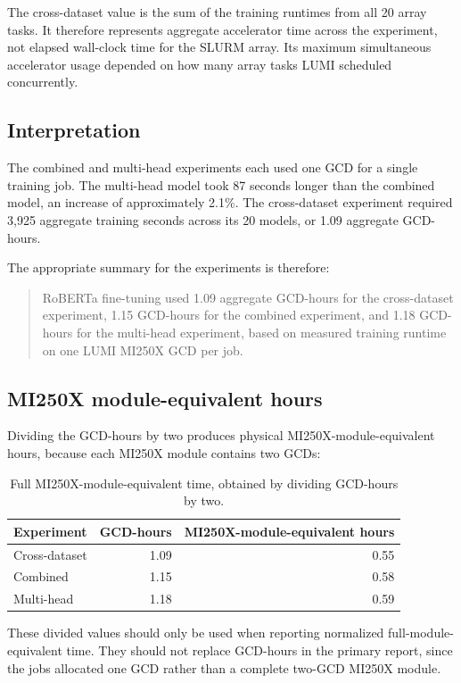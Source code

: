 The cross-dataset value is the sum of the training runtimes from all 20 array tasks. It therefore represents aggregate accelerator time across the experiment, not elapsed wall-clock time for the SLURM array. Its maximum simultaneous accelerator usage depended on how many array tasks LUMI scheduled concurrently.

\subsection*{Interpretation}

The combined and multi-head experiments each used one GCD for a single training job. The multi-head model took 87 seconds longer than the combined model, an increase of approximately 2.1\%. The cross-dataset experiment required 3,925 aggregate training seconds across its 20 models, or 1.09 aggregate GCD-hours.

The appropriate summary for the experiments is therefore:

\begin{quote}
RoBERTa fine-tuning used 1.09 aggregate GCD-hours for the cross-dataset experiment, 1.15 GCD-hours for the combined experiment, and 1.18 GCD-hours for the multi-head experiment, based on measured training runtime on one LUMI MI250X GCD per job.
\end{quote}

\subsection*{MI250X module-equivalent hours}

Dividing the GCD-hours by two produces physical MI250X-module-equivalent hours, because each MI250X module contains two GCDs:

\begin{table}[h!]
\centering
\begin{tabular}{lrr}
\toprule
\textbf{Experiment} & \textbf{GCD-hours} & \textbf{MI250X-module-equivalent hours} \\
\midrule
Cross-dataset & 1.09 & 0.55 \\
Combined & 1.15 & 0.58 \\
Multi-head & 1.18 & 0.59 \\
\bottomrule
\end{tabular}
\caption{Full MI250X-module-equivalent time, obtained by dividing GCD-hours by two.}
\label{tab:lumi_mi250x_equivalent}
\end{table}

These divided values should only be used when reporting normalized full-module-equivalent time. They should not replace GCD-hours in the primary report, since the jobs allocated one GCD rather than a complete two-GCD MI250X module.


